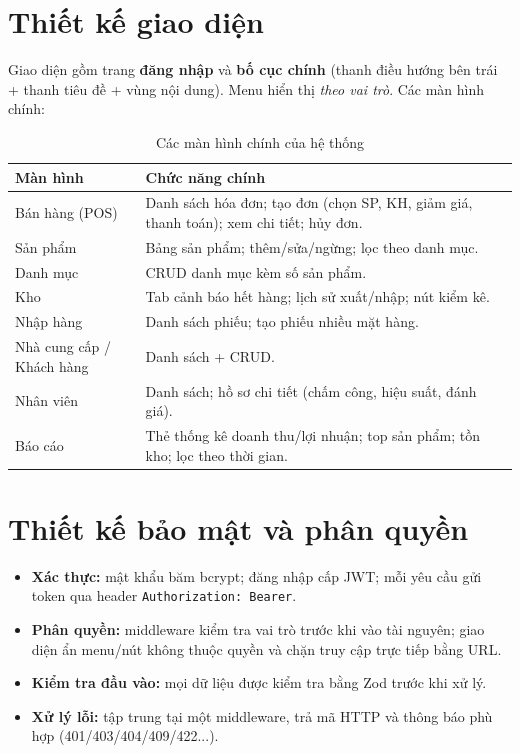 \documentclass[12pt,a4paper]{report}
\begin{document}
\section{Thiết kế giao diện}
Giao diện gồm trang \textbf{đăng nhập} và \textbf{bố cục chính} (thanh điều hướng bên trái + thanh tiêu đề + vùng nội dung). Menu hiển thị \emph{theo vai trò}. Các màn hình chính:
\begin{table}[H]\centering\small
\begin{tabularx}{\textwidth}{|L{3.2cm}|X|}
\hline
\textbf{Màn hình} & \textbf{Chức năng chính} \\ \hline
Bán hàng (POS) & Danh sách hóa đơn; tạo đơn (chọn SP, KH, giảm giá, thanh toán); xem chi tiết; hủy đơn. \\ \hline
Sản phẩm & Bảng sản phẩm; thêm/sửa/ngừng; lọc theo danh mục. \\ \hline
Danh mục & CRUD danh mục kèm số sản phẩm. \\ \hline
Kho & Tab cảnh báo hết hàng; lịch sử xuất/nhập; nút kiểm kê. \\ \hline
Nhập hàng & Danh sách phiếu; tạo phiếu nhiều mặt hàng. \\ \hline
Nhà cung cấp / Khách hàng & Danh sách + CRUD. \\ \hline
Nhân viên & Danh sách; hồ sơ chi tiết (chấm công, hiệu suất, đánh giá). \\ \hline
Báo cáo & Thẻ thống kê doanh thu/lợi nhuận; top sản phẩm; tồn kho; lọc theo thời gian. \\ \hline
\end{tabularx}
\caption{Các màn hình chính của hệ thống}
\end{table}


\section{Thiết kế bảo mật và phân quyền}
\begin{itemize}[leftmargin=1.4cm,nosep]
  \item \textbf{Xác thực:} mật khẩu băm bcrypt; đăng nhập cấp JWT; mỗi yêu cầu gửi token qua header \texttt{Authorization: Bearer}.
  \item \textbf{Phân quyền:} middleware kiểm tra vai trò trước khi vào tài nguyên; giao diện ẩn menu/nút không thuộc quyền và chặn truy cập trực tiếp bằng URL.
  \item \textbf{Kiểm tra đầu vào:} mọi dữ liệu được kiểm tra bằng Zod trước khi xử lý.
  \item \textbf{Xử lý lỗi:} tập trung tại một middleware, trả mã HTTP và thông báo phù hợp (401/403/404/409/422...).
\end{itemize}
\end{document}
